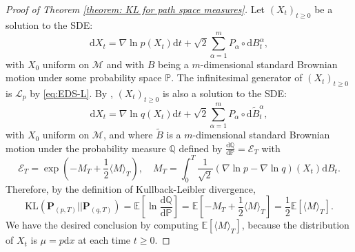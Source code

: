 \documentclass[10pt,a4paper]{article}
\renewcommand{\P}{{\mathbf P}}
\newcommand{\cL}{\mathcal{L}}
\newcommand\cM{\mathcal{M}}
\newcommand\dd{\mathrm{d}}
\newcommand{\SBRA}[1]{{{\left[#1\right]}}} %
\begin{document}
 \begin{proof}[Proof of Theorem \ref{theorem: KL for path space measures}]

 Let $(X_t)_{t\ge 0}$ be a solution to the SDE:
	\[ \mathrm{d} X_t= \nabla\ln p(X_t)\mathrm{d}t + \sqrt{2}\sum_{\alpha=1}^m P_\alpha \circ \mathrm{d}B^\alpha_t, \]
 with $X_0$ uniform on $\cM$ and with \(B\) being a \(m\)-dimensional standard Brownian motion under some probability space \(\mathbb{P}\). The infinitesimal generator of $(X_t)_{t\ge 0}$ is $\cL_p$ by \eqref{eq:EDS-L}.
	By , $(X_t)_{t\ge 0}$ is also a solution to the SDE: 
	\[ \mathrm{d} X_t= \nabla\ln q(X_t)\mathrm{d}t + \sqrt{2}\sum_{\alpha=1}^m P_\alpha \circ \mathrm{d}\widetilde{B}^\alpha_t, \]
 with $X_0$ uniform on $\cM$, and 
	where $\widetilde B$ is a \(m\)-dimensional standard Brownian motion under the probability measure \(\mathbb{Q}\) defined by \(\frac{ \mathrm{d}\mathbb{Q}}{\mathrm{d} \mathbb{P}}= \mathcal{E}_T\) with 
	\[ \mathcal{E}_T=\exp\left( -M_T+\frac{1}{2} \langle M \rangle_T\right), \quad M_T=\int_0^T \frac{1}{\sqrt{2}}\left( \nabla \ln p - \nabla \ln q\right)(X_t)\mathrm{d}B_t. \]
	Therefore, by the definition of Kullback-Leibler divergence,
	\[ \mathrm{KL}(\P_{(p,T)}||\P_{(q,T)})=\mathbb{E}\SBRA{ \ln \frac{\mathrm{d} \mathbb{Q} }{\mathrm{d} \mathbb{P} } } = \mathbb{E}\SBRA{ -M_T+\frac{1}{2}\langle M \rangle_T }= \frac{1}{2}\mathbb{E}\SBRA{\langle M\rangle_T}. \]
	We have the desired conclusion by computing $\mathbb{E}\SBRA{\langle M\rangle_T}$, because the distribution of $X_t$ is $\mu=p\dd x$ at each time $t\ge 0$. 
	\end{proof}
\end{document}
